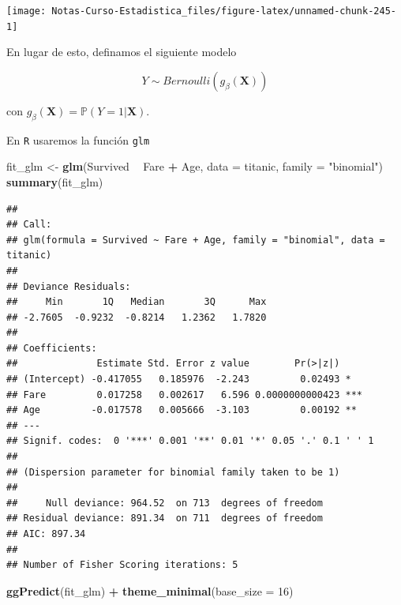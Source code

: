 \documentclass[
  12pt,
]{book}
\newenvironment{Shaded}{\begin{snugshade}}{\end{snugshade}}
\newcommand{\DataTypeTok}[1]{\textcolor[rgb]{0.13,0.29,0.53}{#1}}
\newcommand{\DecValTok}[1]{\textcolor[rgb]{0.00,0.00,0.81}{#1}}
\newcommand{\KeywordTok}[1]{\textcolor[rgb]{0.13,0.29,0.53}{\textbf{#1}}}
\newcommand{\NormalTok}[1]{#1}
\newcommand{\OperatorTok}[1]{\textcolor[rgb]{0.81,0.36,0.00}{\textbf{#1}}}
\newcommand{\StringTok}[1]{\textcolor[rgb]{0.31,0.60,0.02}{#1}}
\theoremstyle{definition}
\theoremstyle{definition}
\theoremstyle{definition}
\theoremstyle{remark}
\begin{document}
\begin{center}\texttt{[image: Notas-Curso-Estadistica\_files/figure-latex/unnamed-chunk-245-1]} \end{center}

En lugar de esto, definamos el siguiente modelo

\begin{equation*}
Y \sim Bernoulli (g_{\beta}(\boldsymbol{X})) 
\end{equation*}

con \(g_{\beta}(\boldsymbol{X}) = \mathbb{P}\left(Y=1 \vert \boldsymbol{X}\right)\).

En \texttt{R} usaremos la función \texttt{glm}

\begin{Shaded}
\begin{Highlighting}[]
\NormalTok{fit_glm <-}\StringTok{ }\KeywordTok{glm}\NormalTok{(Survived }\OperatorTok{~}\StringTok{ }\NormalTok{Fare }\OperatorTok{+}\StringTok{ }\NormalTok{Age, }\DataTypeTok{data =}\NormalTok{ titanic, }
    \DataTypeTok{family =} \StringTok{"binomial"}\NormalTok{)}
\KeywordTok{summary}\NormalTok{(fit_glm)}
\end{Highlighting}
\end{Shaded}

\begin{verbatim}
## 
## Call:
## glm(formula = Survived ~ Fare + Age, family = "binomial", data = titanic)
## 
## Deviance Residuals: 
##     Min       1Q   Median       3Q      Max  
## -2.7605  -0.9232  -0.8214   1.2362   1.7820  
## 
## Coefficients:
##              Estimate Std. Error z value        Pr(>|z|)    
## (Intercept) -0.417055   0.185976  -2.243         0.02493 *  
## Fare         0.017258   0.002617   6.596 0.0000000000423 ***
## Age         -0.017578   0.005666  -3.103         0.00192 ** 
## ---
## Signif. codes:  0 '***' 0.001 '**' 0.01 '*' 0.05 '.' 0.1 ' ' 1
## 
## (Dispersion parameter for binomial family taken to be 1)
## 
##     Null deviance: 964.52  on 713  degrees of freedom
## Residual deviance: 891.34  on 711  degrees of freedom
## AIC: 897.34
## 
## Number of Fisher Scoring iterations: 5
\end{verbatim}

\begin{Shaded}
\begin{Highlighting}[]
\KeywordTok{ggPredict}\NormalTok{(fit_glm) }\OperatorTok{+}\StringTok{ }\KeywordTok{theme_minimal}\NormalTok{(}\DataTypeTok{base_size =} \DecValTok{16}\NormalTok{)}
\end{Highlighting}
\end{Shaded}
\end{document}
